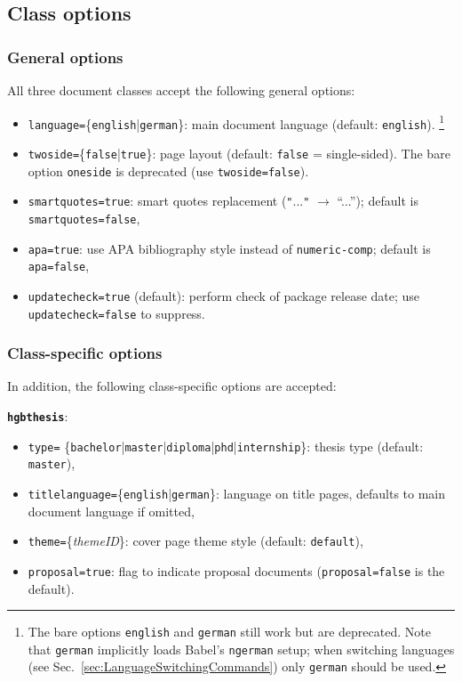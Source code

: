 \documentclass[language=english]{hgbarticle}
\begin{document}
\subsection{Class options}

\subsubsection{General options}

All three document classes accept the following general options:
%
\begin{itemize}
	\item \texttt{language=}\{\texttt{english}|\texttt{german}\}:
		main document language (default: \texttt{english}).%
		\footnote{The bare options \texttt{english} and \texttt{german} still work but are deprecated.
		Note that \texttt{german} implicitly loads Babel's \texttt{ngerman} setup; when switching languages
		(see Sec.~\ref{sec:LanguageSwitchingCommands}) only \texttt{german} should be used.}
	\item \texttt{twoside=}\{\texttt{false}|\texttt{true}\}:
		page layout (default: \texttt{false} = single-sided).
		The bare option \texttt{oneside} is deprecated (use \texttt{twoside=false}).
	\item \texttt{smartquotes=true}:
		smart quotes replacement (\verb!"!...\verb!"! $\rightarrow$ ``...'');
		default is \texttt{smartquotes=false},
	\item \texttt{apa=true}:
		use APA bibliography style instead of \texttt{numeric-comp};
		default is \texttt{apa=false},
	\item \texttt{updatecheck=true} (default): perform check of package release date;
		use \texttt{updatecheck=false} to suppress.
\end{itemize}


\subsubsection{Class-specific options}

In addition, the following class-specific options are accepted:

\noindent\textbf{\texttt{hgbthesis}}:
	\begin{itemize}
		\item \texttt{type=}%
			\{\texttt{bachelor}|\texttt{master}|\texttt{diploma}|\texttt{phd}|\texttt{internship}\}:
				thesis type (default: \texttt{master}),
		\item \texttt{titlelanguage=}\{\texttt{english}|\texttt{german}\}:
			language on title pages, defaults to main document language if omitted,
		\item \texttt{theme=}\{\textit{themeID}\}:
			cover page theme style (default: \texttt{default}),
		\item \texttt{proposal=true}: flag to indicate proposal documents (\texttt{proposal=false} is the default).
	\end{itemize}
\end{document}
